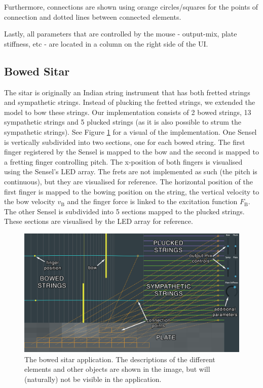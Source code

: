 \documentclass{article}
\begin{document}
Furthermore, connections are shown using orange circles/squares for the points of connection and dotted lines between connected elements.

Lastly, all parameters that are controlled by the mouse - output-mix, plate stiffness, etc - are located in a column on the right side of the UI.

\subsection{Bowed Sitar}
The sitar is originally an Indian string instrument that has both fretted strings and sympathetic strings. Instead of plucking the fretted strings, we extended the model to bow these strings. Our implementation consists of 2 bowed strings, 13 sympathetic strings and 5 plucked strings (as it is also possible to strum the sympathetic strings). See Figure \ref{fig:bowedSitar} for a visual of the implementation. One Sensel is vertically subdivided into two sections, one for each bowed string. The first finger registered by the Sensel is mapped to the bow and the second is mapped to a fretting finger controlling pitch. The x-position of both fingers is visualised using the Sensel's LED array. The frets are not implemented as such (the pitch is continuous), but they are visualised for reference. The horizontal position of the first finger is mapped to the bowing position on the string, the vertical velocity to the bow velocity $v_\text{B}$ and the finger force is linked to the excitation function $F_\text{B}$. The other Sensel is subdivided into 5 sections mapped to the plucked strings. These sections are visualised by the LED array for reference.

\begin{figure}[h]
\centering
\includegraphics[width=1.0\columnwidth]{BowedSitar.png}
\caption{The bowed sitar application. The descriptions of the different elements and other objects are shown in the image, but will (naturally) not be visible in the application. \label{fig:bowedSitar}}
\end{figure}
\end{document}
